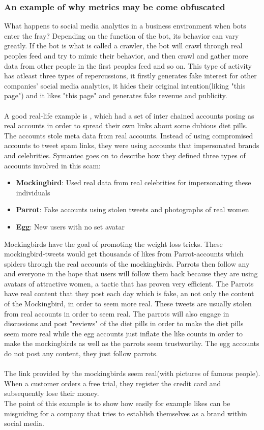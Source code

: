 \subsubsection*{An example of why metrics may be come obfuscated}
What happens to social media analytics in a business environment when bots enter the fray? Depending on the function of the bot, its behavior can vary greatly. If the bot is what is called a crawler, the bot will crawl through real peoples feed and try to mimic their behavior, and then crawl and gather more data from other people in the first peoples feed and so on. This type of activity has atleast three types of repercussions, it firstly generates fake interest for other companies' social media analytics, it hides their original intention(liking "this page") and it likes "this page" and generates fake revenue and publicity.
\\
\\
A good real-life example is \cite{Symantec:Narang}, which had a set of inter chained accounts posing as real accounts in order to spread their own links about some dubious diet pills. The accounts stole meta data from real accounts. Instead of using compromised
accounts to tweet spam links, they were using accounts that impersonated brands and
celebrities. Symantec goes on to describe how they defined three types of accounts involved in this scam:
\begin{itemize}
\item {\textbf{Mockingbird}: Used real data from real celebrities for impersonating these individuals}
\item{\textbf{Parrot}: Fake accounts using stolen tweets and photographs of real women}
\item{\textbf{Egg}: New users with no set avatar}
\end{itemize}
Mockingbirds have the goal of promoting the weight loss tricks. These mockingbird-tweets would get thousands of likes from Parrot-accounts which spiders through the real accounts of the mockingbirds. Parrots then follow any and everyone in the hope that users will follow them back because they are using avatars of attractive women, a tactic that has proven very efficient. The Parrots have real content that they post each day which is fake, an not only the content of the Mockingbird, in order to seem more real. These tweets are usually stolen from real accounts in order to seem real.  The parrots will also engage in discussions and post "reviews" of the diet pills in order to make the diet pills seem more real while the egg accounts just inflate the like counts in order to make the mockingbirds as well as the parrots seem trustworthy. The egg accounts do not post any content, they just follow parrots.
\\
\\ The link provided by the mockingbirds seem real(with pictures of famous people). When a customer orders a free trial, they register the credit card and subsequently lose their money. 
\\
The point of this example is to show how easily for example likes can be misguiding for a company that tries to establish themselves as a brand within social media. 


